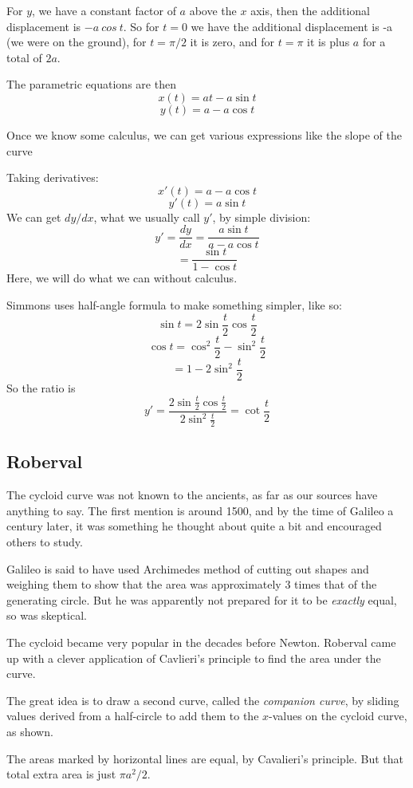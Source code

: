 \documentclass[11pt, oneside]{article}
\begin{document}
For $y$, we have a constant factor of $a$ above the $x$ axis, then the additional displacement is $-a \ cos \ t$.  So for $t=0$ we have the additional displacement is -a (we were on the ground), for $t=\pi/2$ it is zero, and for $t=\pi$ it is plus $a$ for a total of $2a$.

The parametric equations are then
\[ x(t) = at - a \sin t \]
\[ y(t) = a - a \cos t \]

Once we know some calculus, we can get various expressions like the slope of the curve

Taking derivatives:
\[ x'(t) = a - a \cos t \]
\[ y'(t) = a \sin t  \]
We can get $dy/dx$, what we usually call $y'$, by simple division:
\[ y' = \frac{dy}{dx} = \frac{a \sin t }{a - a \cos t} \]
\[ = \frac{\sin t}{1 - \cos t} \]
Here, we will do what we can without calculus.

Simmons uses half-angle formula to make something simpler, like so:
\[ \sin t = 2 \sin \frac{t}{2} \cos \frac{t}{2} \]
\[ \cos t = \cos^2 \frac{t}{2} - \sin^2 \frac{t}{2} \]
\[ = 1 - 2 \sin^2 \frac{t}{2} \]
So the ratio is
\[ y' = \frac{ 2 \sin \frac{t}{2} \cos \frac{t}{2}}{2 \sin^2 \frac{t}{2}} = \cot \frac{t}{2} \]

\subsection*{Roberval}
The cycloid curve was not known to the ancients, as far as our sources have anything to say.  The first mention is around 1500, and by the time of Galileo a century later, it was something he thought about quite a bit and encouraged others to study.  

Galileo is said to have used Archimedes method of cutting out shapes and weighing them to show that the area was approximately $3$ times that of the generating circle.  But he was apparently not prepared for it to be \emph{exactly} equal, so was skeptical.

The cycloid became very popular in the decades before Newton.  Roberval came up with a clever application of Cavlieri's principle to find the area under the curve.

The great idea is to draw a second curve, called the \emph{companion curve}, by sliding values derived from a half-circle to add them to the $x$-values on the cycloid curve, as shown.

The areas marked by horizontal lines are equal, by Cavalieri's principle.
But that total extra area is just $\pi a^2 / 2$.
\end{document}
